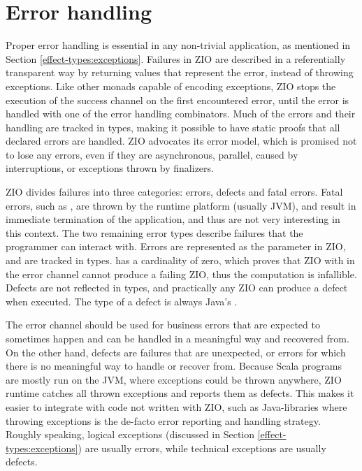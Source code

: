 



\section{Error handling} \label{zio:error-handling}
Proper error handling is essential in any non-trivial application, as mentioned in Section \ref{effect-types:exceptions}. Failures in ZIO are described in a referentially transparent way by returning values that represent the error, instead of throwing exceptions. Like other monads capable of encoding exceptions, ZIO stops the execution of the success channel on the first encountered error, until the error is handled with one of the error handling combinators. Much of the errors and their handling are tracked in types, making it possible to have static proofs that all declared errors are handled. ZIO advocates its error model, which is promised not to lose any errors, even if they are asynchronous, parallel, caused by interruptions, or exceptions thrown by finalizers.

ZIO divides failures into three categories: errors, defects and fatal errors. Fatal errors, such as , are thrown by the runtime platform (usually JVM), and result in immediate termination of the application, and thus are not very interesting in this context.
The two remaining error types describe failures that the programmer can interact with. Errors are represented as the  parameter in ZIO, and are tracked in types.  has a cardinality of zero, which proves that ZIO with  in the error channel cannot produce a failing ZIO, thus the computation is infallible. Defects are not reflected in types, and practically any ZIO can produce a defect when executed. The type of a defect is always Java's .

The error channel should be used for business errors that are expected to sometimes happen and can be handled in a meaningful way and recovered from. On the other hand, defects are failures that are unexpected, or errors for which there is no meaningful way to handle or recover from. Because Scala programs are mostly run on the JVM, where exceptions could be thrown anywhere, ZIO runtime catches all thrown exceptions and reports them as defects. This makes it easier to integrate with code not written with ZIO, such as Java-libraries where throwing exceptions is the de-facto error reporting and handling strategy. Roughly speaking, logical exceptions (discussed in Section \ref{effect-types:exceptions}) are usually errors, while technical exceptions are usually defects.

